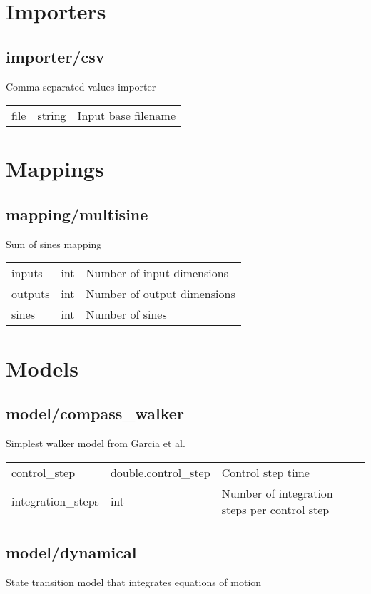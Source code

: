 \section{Importers}
\subsection{importer/csv}
\noindent Comma-separated values importer\\

\noindent\begin{tabular}{@{}lll@{}}
file&string&Input base filename\\
\end{tabular}
\section{Mappings}
\subsection{mapping/multisine}
\noindent Sum of sines mapping\\

\noindent\begin{tabular}{@{}lll@{}}
inputs&int&Number of input dimensions\\
outputs&int&Number of output dimensions\\
sines&int&Number of sines\\
\end{tabular}
\section{Models}
\subsection{model/compass\_walker}
\noindent Simplest walker model from Garcia et al.\\

\noindent\begin{tabular}{@{}lll@{}}
control\_step&double.control\_step&Control step time\\
integration\_steps&int&Number of integration steps per control step\\
\end{tabular}
\subsection{model/dynamical}
\noindent State transition model that integrates equations of motion\\

